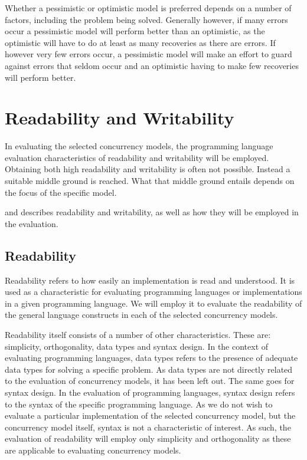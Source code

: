 Whether a pessimistic or optimistic model is preferred depends on a number of factors, including the problem being solved. Generally however, if many errors occur a pessimistic model will perform better than an optimistic, as the optimistic will have to do at least as many recoveries as there are errors. If however very few errors occur, a pessimistic model will make an effort to guard against errors that seldom occur and an optimistic having to make few recoveries will perform better.

\section{Readability and Writability}\label{sec:char_read_write}
In evaluating the selected concurrency models, the programming language evaluation characteristics of readability and writability will be employed. Obtaining both high readability and writability is often not possible. Instead a suitable middle ground is reached. What that middle ground entails depends on the focus of the specific model.

 and  describes readability and writability, as well as how they will be employed in the evaluation.

\subsection{Readability}\label{sec:readability}
Readability refers to how easily an implementation is read and understood\cite[p. 8]{sebestaProLang}. It is used as a characteristic for evaluating programming languages or implementations in a given programming language. We will employ it to evaluate the readability of the general language constructs in each of the selected concurrency models.

Readability itself consists of a number of other characteristics. These are\cite[p. 8]{sebestaProLang}: simplicity, orthogonality, data types and syntax design. In the context of evaluating programming languages, data types refers to the presence of adequate data types for solving a specific problem. As data types are not directly related to the evaluation of concurrency models, it has been left out. The same goes for syntax design. In the evaluation of programming languages, syntax design refers to the syntax of the specific programming language. As we do not wish to evaluate a particular implementation of the selected concurrency model, but the concurrency model itself, syntax is not a characteristic of interest. As such, the evaluation of readability will employ only simplicity and orthogonality as these are applicable to evaluating concurrency models.

